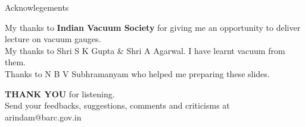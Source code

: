\documentclass[11pt]{beamer}
\begin{document}
\begin{frame}{Acknowlegements}

\begin{block}{} 

		\begin{center}
			My thanks to \textbf{Indian Vacuum Society} for giving me an opportunity to deliver lecture on vacuum gauges.\\
			My thanks to  Shri S K Gupta \&  Shri A Agarwal. I have learnt vacuum from them. \\
			Thanks to N B V Subhramanyam who helped me preparing these slides.
		\end{center} 	



\end {block}

\begin{block}{} 

		\begin{center}
			\textbf{THANK YOU} for listening.\\
			Send your feedbacks, suggestions, comments and criticisms at arindam@barc.gov.in
		\end{center} 	



\end {block}


\end{frame}
\end{document}
